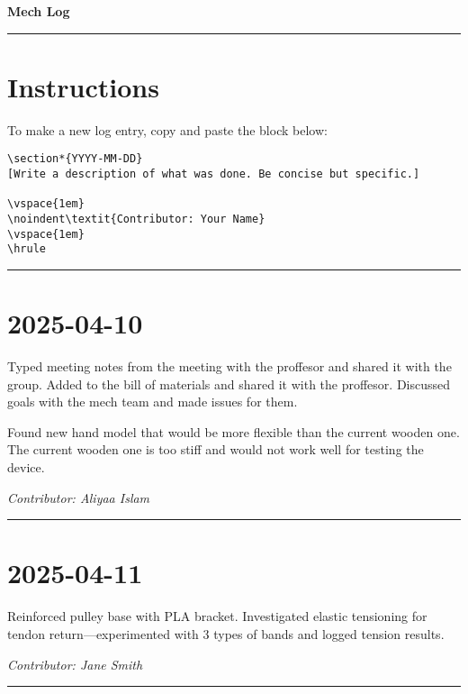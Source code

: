 \documentclass[12pt]{article}
\begin{document}
\begin{center}
    {\Huge\bfseries Mech Log}
\end{center}
\vspace{1em}
\hrule
\vspace{1em}

\section*{Instructions}
To make a new log entry, copy and paste the block below:

\begin{verbatim}
\section*{YYYY-MM-DD}
[Write a description of what was done. Be concise but specific.]

\vspace{1em}
\noindent\textit{Contributor: Your Name}
\vspace{1em}
\hrule
\end{verbatim}

\vspace{1em}
\hrule
\vspace{1em}


\section*{2025-04-10}
Typed meeting notes from the meeting with the proffesor and shared it with the group. Added to the bill of materials and shared it with the proffesor. Discussed goals with the mech team and made issues for them. 

Found new hand model that would be more flexible than the current wooden one. The current wooden one is too stiff and would not work well for testing the device. 

\vspace{1em}
\noindent\textit{Contributor: Aliyaa Islam}
\vspace{1em}
\hrule

\section*{2025-04-11}
Reinforced pulley base with PLA bracket. Investigated elastic tensioning for tendon return—experimented with 3 types of bands and logged tension results.

\vspace{1em}
\noindent\textit{Contributor: Jane Smith}
\vspace{1em}
\hrule

\end{document}
